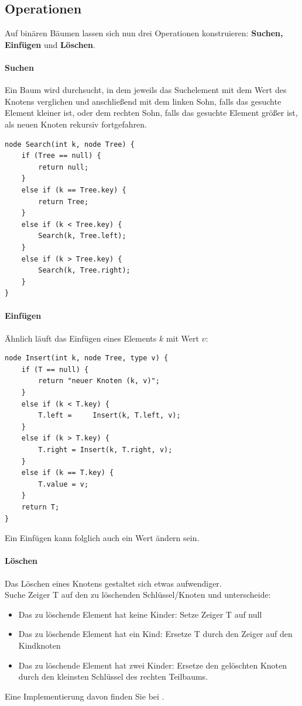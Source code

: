 \documentclass[11pt,a4paper]{scrartcl}
\begin{document}
\subsection{Operationen}
Auf binären Bäumen lassen sich nun drei Operationen konstruieren: \textbf{Suchen, Einfügen} und \textbf{Löschen}.
\paragraph{Suchen}
\label{searchBinTree}
Ein Baum wird durchsucht, in dem jeweils das Suchelement mit dem Wert des Knotens verglichen und anschließend mit dem linken Sohn, falls das gesuchte Element kleiner ist, oder dem rechten Sohn, falls das gesuchte Element größer ist, als neuen Knoten rekursiv fortgefahren.
\begin{lstlisting}
node Search(int k, node Tree) {
	if (Tree == null) {
		return null;	
	}
	else if (k == Tree.key) {
		return Tree;	
	}
	else if (k < Tree.key) {
		Search(k, Tree.left);	
	}
	else if (k > Tree.key) {
		Search(k, Tree.right);	
	}
}
\end{lstlisting}
\paragraph{Einfügen}
Ähnlich läuft das Einfügen eines Elements $k$ mit Wert $v$: 
\begin{lstlisting}
node Insert(int k, node Tree, type v) {
	if (T == null) {
		return "neuer Knoten (k, v)";	
	}
	else if (k < T.key) {
		T.left =	 Insert(k, T.left, v);
	}
	else if (k > T.key) {
		T.right = Insert(k, T.right, v);	
	}
	else if (k == T.key) {
		T.value = v;
	}
	return T;
}
\end{lstlisting}
Ein Einfügen kann folglich auch ein {\glqq}Wert ändern{\grqq} sein.
\paragraph{Löschen}
Das Löschen eines Knotens gestaltet sich etwas aufwendiger. \\
Suche Zeiger T auf den zu löschenden Schlüssel/Knoten und unterscheide:
\begin{itemize}
\item Das zu löschende Element hat keine Kinder: Setze Zeiger T auf null
\item Das zu löschende Element hat ein Kind: Ersetze T durch den Zeiger auf den Kindknoten
\item Das zu löschende Element hat zwei Kinder: Ersetze den gelöschten Knoten durch den kleinsten Schlüssel des rechten Teilbaums.
\end{itemize}
Eine Implementierung davon finden Sie bei \parencite{Wirth}.
\end{document}
